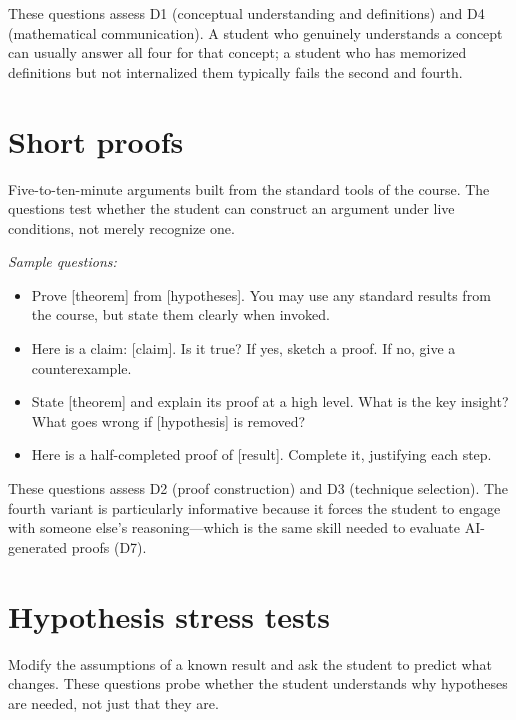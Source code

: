 \documentclass[11pt]{book}
\begin{document}
These questions assess D1 (conceptual understanding and definitions) and D4 (mathematical communication). A student who genuinely understands a concept can usually answer all four for that concept; a student who has memorized definitions but not internalized them typically fails the second and fourth.

\section{Short proofs}

Five-to-ten-minute arguments built from the standard tools of the course. The questions test whether the student can construct an argument under live conditions, not merely recognize one.

\textit{Sample questions:}

\begin{itemize}\setlength{\itemsep}{2pt}
\item Prove [theorem] from [hypotheses]. You may use any standard results from the course, but state them clearly when invoked.
\item Here is a claim: [claim]. Is it true? If yes, sketch a proof. If no, give a counterexample.
\item State [theorem] and explain its proof at a high level. What is the key insight? What goes wrong if [hypothesis] is removed?
\item Here is a half-completed proof of [result]. Complete it, justifying each step.
\end{itemize}

These questions assess D2 (proof construction) and D3 (technique selection). The fourth variant is particularly informative because it forces the student to engage with someone else's reasoning---which is the same skill needed to evaluate AI-generated proofs (D7).

\section{Hypothesis stress tests}

Modify the assumptions of a known result and ask the student to predict what changes. These questions probe whether the student understands why hypotheses are needed, not just that they are.
\end{document}
